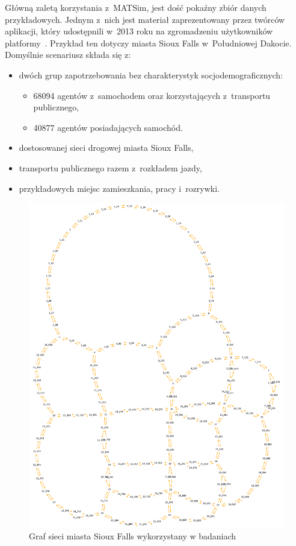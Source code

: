 \documentclass[twoside,12pt]{report}
\begin{document}
Główną zaletą korzystania z~MATSim, jest dość pokaźny zbiór danych przykładowych. Jednym z~nich jest materiał zaprezentowany przez twórców aplikacji, który udostępnili w~2013 roku na zgromadzeniu użytkowników platformy~\cite{siux}. Przykład ten dotyczy miasta Sioux Falls w~Południowej Dakocie. Domyślnie scenariusz składa się z:

\begin{itemize}
\item dwóch grup zapotrzebowania bez charakterystyk socjodemograficznych:
\begin{itemize}
\item 68094 agentów z~samochodem oraz korzystających z~transportu publicznego,
\item 40877 agentów posiadających samochód.
\end{itemize}
\item dostosowanej sieci drogowej miasta Sioux Falls,
\item transportu publicznego razem z~rozkładem jazdy,
\item przykładowych miejsc zamieszkania, pracy i~rozrywki.
\end{itemize}

\begin{figure}[htbp]
	\centering
	\includegraphics[totalheight=0.560\textheight,angle=90]{img/sioux/network}
	\caption{Graf sieci miasta Sioux Falls wykorzystany w badaniach} 
	\label{fig:siouxfalls_siec}
\end{figure}
\end{document}
